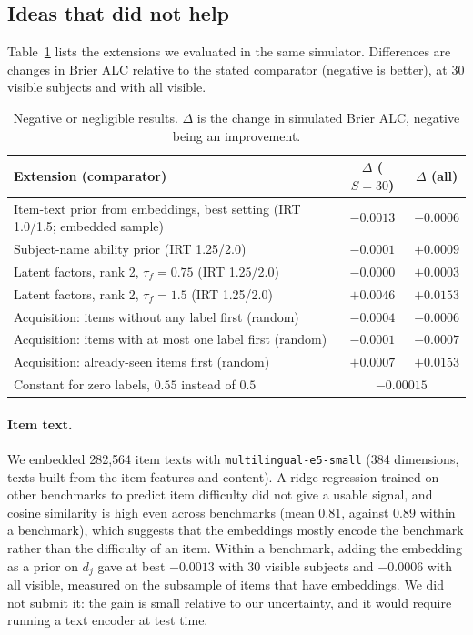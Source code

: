 \documentclass{article}
\begin{document}
\subsection{Ideas that did not help}
\label{sec:negative}
Table~\ref{tab:neg} lists the extensions we evaluated in the same simulator. Differences are changes in Brier ALC relative to the stated comparator (negative is better), at 30 visible subjects and with all visible.

\begin{table}[h]
\centering
\caption{Negative or negligible results. $\Delta$ is the change in simulated Brier ALC, negative being an improvement.}
\label{tab:neg}
\begin{tabular}{p{6.2cm}cc}
\toprule
Extension (comparator) & $\Delta$ ($S{=}30$) & $\Delta$ (all) \\
\midrule
Item-text prior from embeddings, best setting (IRT 1.0/1.5; embedded sample) & $-0.0013$ & $-0.0006$ \\
Subject-name ability prior (IRT 1.25/2.0) & $-0.0001$ & $+0.0009$ \\
Latent factors, rank 2, $\tau_f{=}0.75$ (IRT 1.25/2.0) & $-0.0000$ & $+0.0003$ \\
Latent factors, rank 2, $\tau_f{=}1.5$ (IRT 1.25/2.0) & $+0.0046$ & $+0.0153$ \\
Acquisition: items without any label first (random) & $-0.0004$ & $-0.0006$ \\
Acquisition: items with at most one label first (random) & $-0.0001$ & $-0.0007$ \\
Acquisition: already-seen items first (random) & $+0.0007$ & $+0.0153$ \\
Constant for zero labels, $0.55$ instead of $0.5$ & \multicolumn{2}{c}{$-0.00015$} \\
\bottomrule
\end{tabular}
\end{table}

\paragraph{Item text.} We embedded 282{,}564 item texts with \texttt{multilingual-e5-small} \citep{wang2024multilingual} (384 dimensions, texts built from the item features and content). A ridge regression trained on other benchmarks to predict item difficulty did not give a usable signal, and cosine similarity is high even across benchmarks (mean 0.81, against 0.89 within a benchmark), which suggests that the embeddings mostly encode the benchmark rather than the difficulty of an item. Within a benchmark, adding the embedding as a prior on $d_j$ gave at best $-0.0013$ with 30 visible subjects and $-0.0006$ with all visible, measured on the subsample of items that have embeddings. We did not submit it: the gain is small relative to our uncertainty, and it would require running a text encoder at test time.
\end{document}
